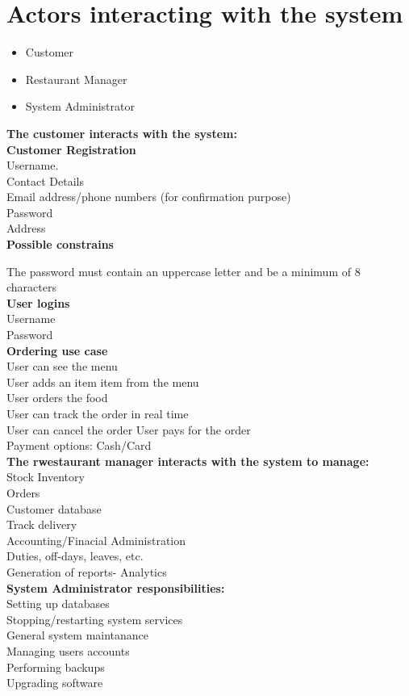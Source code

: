 \documentclass[11pt]{article}
\begin{document}
\section{Actors interacting with the system}
\begin{itemize}
 \item Customer
 \item Restaurant Manager
 \item System Administrator
\end{itemize} 

\textbf{The customer interacts with the system:}\\

\textbf{Customer Registration}
\\
\textemdash Username.\\
\textemdash Contact Details \\
\textemdash Email address/phone numbers (for confirmation purpose)\\
\textemdash Password \\
\textemdash Address\\

\textbf{Possible constrains}

The password must contain an uppercase letter and be a minimum of 8 characters
\\
 
\textbf{User logins}
\\
\textemdash Username \\ 
\textemdash Password
\\

\textbf{Ordering use case}
\\
\textemdash User can see the menu \\
\textemdash User adds an item  item from the menu \\
\textemdash User orders the food \\
\textemdash User can track the order in real time\\
\textemdash User can cancel the order 
\textemdash User pays for the order\\
\textemdash Payment options: Cash/Card\\

\textbf{The rwestaurant manager interacts with the system to manage:}
\\
\textemdash Stock Inventory \\
\textemdash Orders\\
\textemdash Customer database \\
\textemdash Track delivery\\
\textemdash Accounting/Finacial Administration\\ 
\textemdash Duties, off-days, leaves, etc.\\
\textemdash Generation of reports- Analytics\\

\textbf{System Administrator responsibilities:}\\
\textemdash Setting up databases \\
\textemdash Stopping/restarting system services\\
\textemdash General system maintanance\\
\textemdash Managing users accounts\\
\textemdash Performing backups\\ 
\textemdash Upgrading software\\
\end{document}
